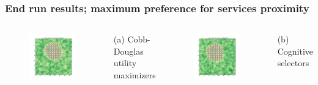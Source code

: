 \documentclass{beamer}
\begin{document}

\begin{frame}
\frametitle{End run results; maximum preference for services proximity}

\begin{columns}[t] %

\begin{figure}
\includegraphics[width=0.9\linewidth]{qual_cd_2_0.png}
\end{figure}
(a) Cobb-Douglas utility maximizers

\begin{figure}
\includegraphics[width=0.9\linewidth]{qual_cog2_2_0.png}
\end{figure}
(b) Cognitive selectors

\end{columns}
\end{frame}
\end{document}
